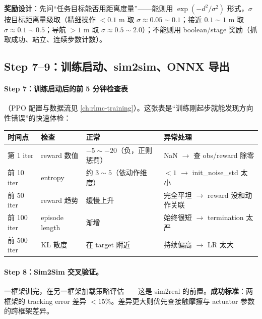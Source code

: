 \textbf{奖励设计}：先问“任务目标能否用距离度量”——能则用 $\exp(-d^2/\sigma^2)$ 形式，$\sigma$ 按目标距离量级取（精细操作 $<0.1$ m 取 $\sigma\approx 0.05\sim 0.1$；接近 $0.1\sim 1$ m 取 $\sigma\approx 0.1\sim 0.5$；导航 $>1$ m 取 $\sigma\approx 0.5\sim 2.0$）；不能则用 boolean/stage 奖励（抓取成功、站立、连续步数计数）。

\subsection{Step 7--9：训练启动、sim2sim、ONNX 导出}
\label{sec:rlmc-diy-pipe-train}

\paragraph{Step 7：训练启动后的前 5 分钟检查表}（PPO 配置与数据流见 \cref{ch:rlmc-training}）。这张表是“训练刚起步就能发现方向性错误”的快速体检：

\begin{center}
\small
\begin{tabular}{@{}lp{3.0cm}p{3.4cm}p{3.6cm}@{}}
\toprule
时间点 & 检查 & 正常 & 异常处理 \\
\midrule
第 1 iter & reward 数值 & $-5\sim -20$（负，正则惩罚） & NaN $\to$ 查 obs/reward 除零 \\
前 10 iter & entropy & 约 $3\sim 5$（依动作维度） & $<1$ $\to$ init\_noise\_std 太小 \\
前 50 iter & reward 趋势 & 缓慢上升 & 完全平坦 $\to$ reward 没和动作关联 \\
前 100 iter & episode length & 渐增 & 始终很短 $\to$ termination 太严 \\
前 500 iter & KL 散度 & 在 target 附近 & 持续偏高 $\to$ LR 太大 \\
\bottomrule
\end{tabular}
\end{center}

\paragraph{Step 8：Sim2Sim 交叉验证。}一框架训完，在另一框架加载策略评估——这是 sim2real 的前置。\textbf{成功标准}：两框架的 tracking error 差异 $<15\%$。差异更大则优先查接触摩擦与 actuator 参数的跨框架差异。


